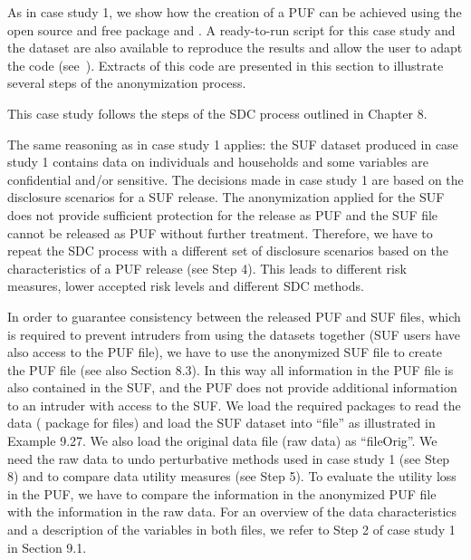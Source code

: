 \documentclass[letterpaper,10pt,english]{sphinxmanual}
\begin{document}
As in case study 1, we show how the creation of a PUF can be achieved
using the open source and free  package and . A
ready-to-run  script for this case study and the dataset are also
available to reproduce the results and allow the user to adapt the code
(see ). Extracts of this code
are presented in this section to illustrate several steps of the
anonymization process. 

This case study follows the steps of the SDC process outlined in Chapter
8.


The same reasoning as in case study 1 applies: the SUF dataset produced
in case study 1 contains data on individuals and households and some
variables are confidential and/or sensitive. The decisions made in case
study 1 are based on the disclosure scenarios for a SUF release. The
anonymization applied for the SUF does not provide sufficient protection
for the release as PUF and the SUF file cannot be released as PUF
without further treatment. Therefore, we have to repeat the SDC process
with a different set of disclosure scenarios based on the
characteristics of a PUF release (see Step 4). This leads to different
risk measures, lower accepted risk levels and different SDC methods.


In order to guarantee consistency between the released PUF and SUF
files, which is required to prevent intruders from using the datasets
together (SUF users have also access to the PUF file), we have to use
the anonymized SUF file to create the PUF file (see also Section 8.3).
In this way all information in the PUF file is also contained in the
SUF, and the PUF does not provide additional information to an intruder
with access to the SUF. We load the required packages to read the data
( package for  files) and load the SUF dataset into
“file” as illustrated in Example 9.27. We also load the original data
file (raw data) as “fileOrig”. We need the raw data to undo perturbative
methods used in case study 1 (see Step 8) and to compare data utility
measures (see Step 5). To evaluate the utility loss in the PUF, we have
to compare the information in the anonymized PUF file with the
information in the raw data. For an overview of the data characteristics
and a description of the variables in both files, we refer to Step 2 of
case study 1 in Section 9.1.
\end{document}
